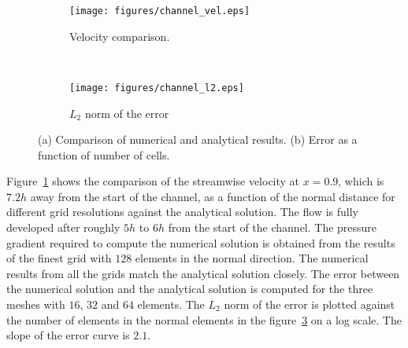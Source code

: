\begin{figure}[h!]
    \centering
    \captionsetup{justification=centering}
    \begin{subfigure}[b]{0.45\textwidth}
    \centering
    \captionsetup{justification=centering}
        \texttt{[image: figures/channel\_vel.eps]}
        \caption{Velocity comparison.}
        \label{fig:chvelcmp}
    \end{subfigure}
    ~ %
    \begin{subfigure}[b]{0.45\textwidth}
    \centering
    \captionsetup{justification=centering}
        \texttt{[image: figures/channel\_l2.eps]}
        \caption{$L_2$ norm of the error}
        \label{fig:chl2}
    \end{subfigure}
    \caption{(a) Comparison of numerical and analytical results. (b) Error as a function of number of cells.}
\end{figure}
Figure~\ref{fig:chvelcmp} shows the comparison of the streamwise velocity at $x=0.9$, which is $7.2h$ away from the start of the channel, as a function of the normal distance for different grid resolutions against the analytical solution. The flow is fully developed after roughly $5h$ to $6h$ from the start of the channel. The pressure gradient required to compute the numerical solution is obtained from the results of the finest grid with $128$ elements in the normal direction. The numerical results from all the grids match the analytical solution closely. The error between the numerical solution and the analytical solution is computed for the three meshes with $16$, $32$ and $64$ elements. The $L_2$ norm of the error is plotted against the number of elements in the normal elements in the figure~\ref{fig:chl2} on a log scale. The slope of the error curve is $2.1$.

